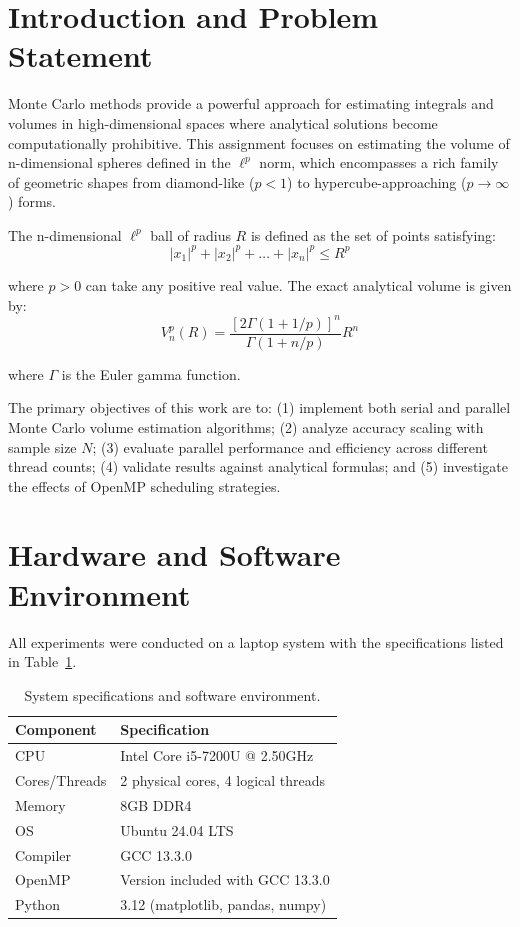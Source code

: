\documentclass[11pt,a4paper]{article}
\begin{document}
	\section{Introduction and Problem Statement}
	
	Monte Carlo methods provide a powerful approach for estimating integrals and volumes in high-dimensional spaces where analytical solutions become computationally prohibitive. This assignment focuses on estimating the volume of n-dimensional spheres defined in the $\ell^p$ norm, which encompasses a rich family of geometric shapes from diamond-like ($p < 1$) to hypercube-approaching ($p \to \infty$) forms.
	
	The n-dimensional $\ell^p$ ball of radius $R$ is defined as the set of points satisfying:
	\begin{equation}\label{eq:p_ball_definition}
		|x_1|^p + |x_2|^p + \ldots + |x_n|^p \le R^p
	\end{equation}
	
	where $p > 0$ can take any positive real value. The exact analytical volume is given by:
	\begin{equation}\label{eq:exact_volume}
		V_n^p(R) = \frac{[2\Gamma(1+1/p)]^n}{\Gamma(1+n/p)} R^n
	\end{equation}
	
	where $\Gamma$ is the Euler gamma function.
	
	The primary objectives of this work are to: (1) implement both serial and parallel Monte Carlo volume estimation algorithms; (2) analyze accuracy scaling with sample size $N$; (3) evaluate parallel performance and efficiency across different thread counts; (4) validate results against analytical formulas; and (5) investigate the effects of OpenMP scheduling strategies.
	
	\section{Hardware and Software Environment}
	
	All experiments were conducted on a laptop system with the specifications listed in Table~\ref{table:system_specs}.
	
	\begin{table}[H]
		\centering
		\caption{System specifications and software environment.}
		\label{table:system_specs}
		\begin{tabular}{ll}
			\toprule
			Component & Specification \\
			\midrule
			CPU & Intel Core i5-7200U @ 2.50GHz \\
			Cores/Threads & 2 physical cores, 4 logical threads \\
			Memory & 8GB DDR4 \\
			OS & Ubuntu 24.04 LTS \\
			Compiler & GCC 13.3.0 \\
			OpenMP & Version included with GCC 13.3.0 \\
			Python & 3.12 (matplotlib, pandas, numpy) \\
			\bottomrule
		\end{tabular}
	\end{table}
	
\end{document}
